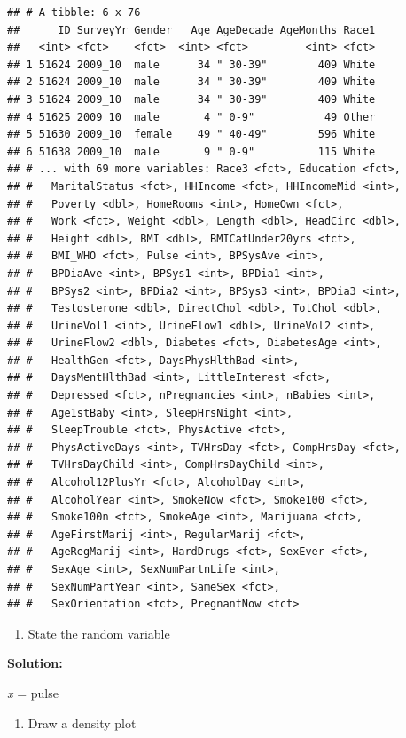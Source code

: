 \documentclass[
]{book}
\providecommand{\tightlist}{%
  \setlength{\itemsep}{0pt}\setlength{\parskip}{0pt}}
\begin{document}
\begin{verbatim}
## # A tibble: 6 x 76
##      ID SurveyYr Gender   Age AgeDecade AgeMonths Race1
##   <int> <fct>    <fct>  <int> <fct>         <int> <fct>
## 1 51624 2009_10  male      34 " 30-39"        409 White
## 2 51624 2009_10  male      34 " 30-39"        409 White
## 3 51624 2009_10  male      34 " 30-39"        409 White
## 4 51625 2009_10  male       4 " 0-9"           49 Other
## 5 51630 2009_10  female    49 " 40-49"        596 White
## 6 51638 2009_10  male       9 " 0-9"          115 White
## # ... with 69 more variables: Race3 <fct>, Education <fct>,
## #   MaritalStatus <fct>, HHIncome <fct>, HHIncomeMid <int>,
## #   Poverty <dbl>, HomeRooms <int>, HomeOwn <fct>,
## #   Work <fct>, Weight <dbl>, Length <dbl>, HeadCirc <dbl>,
## #   Height <dbl>, BMI <dbl>, BMICatUnder20yrs <fct>,
## #   BMI_WHO <fct>, Pulse <int>, BPSysAve <int>,
## #   BPDiaAve <int>, BPSys1 <int>, BPDia1 <int>,
## #   BPSys2 <int>, BPDia2 <int>, BPSys3 <int>, BPDia3 <int>,
## #   Testosterone <dbl>, DirectChol <dbl>, TotChol <dbl>,
## #   UrineVol1 <int>, UrineFlow1 <dbl>, UrineVol2 <int>,
## #   UrineFlow2 <dbl>, Diabetes <fct>, DiabetesAge <int>,
## #   HealthGen <fct>, DaysPhysHlthBad <int>,
## #   DaysMentHlthBad <int>, LittleInterest <fct>,
## #   Depressed <fct>, nPregnancies <int>, nBabies <int>,
## #   Age1stBaby <int>, SleepHrsNight <int>,
## #   SleepTrouble <fct>, PhysActive <fct>,
## #   PhysActiveDays <int>, TVHrsDay <fct>, CompHrsDay <fct>,
## #   TVHrsDayChild <int>, CompHrsDayChild <int>,
## #   Alcohol12PlusYr <fct>, AlcoholDay <int>,
## #   AlcoholYear <int>, SmokeNow <fct>, Smoke100 <fct>,
## #   Smoke100n <fct>, SmokeAge <int>, Marijuana <fct>,
## #   AgeFirstMarij <int>, RegularMarij <fct>,
## #   AgeRegMarij <int>, HardDrugs <fct>, SexEver <fct>,
## #   SexAge <int>, SexNumPartnLife <int>,
## #   SexNumPartYear <int>, SameSex <fct>,
## #   SexOrientation <fct>, PregnantNow <fct>
\end{verbatim}

\begin{enumerate}
\def\labelenumi{\alph{enumi}.}
\tightlist
\item
  State the random variable
\end{enumerate}

\textbf{Solution:}

\emph{x} = pulse

\begin{enumerate}
\def\labelenumi{\alph{enumi}.}
\setcounter{enumi}{1}
\tightlist
\item
  Draw a density plot
\end{enumerate}
\end{document}
